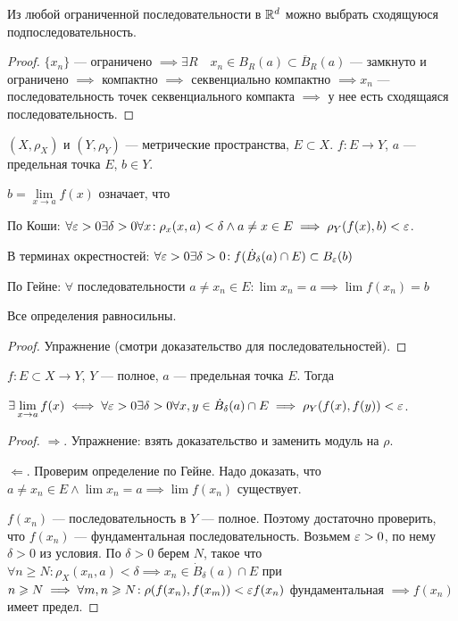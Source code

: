 \begin{theorem}
    Из любой ограниченной последовательности в $\mathbb{R}^d$ можно выбрать сходящуюся подпоследовательность.
\end{theorem}
\begin{proof}
    $\{x_n\}$ --- ограничено $\implies \exists R\quad x_n \in B_R(a) \subset \overline{B}_R(a)$ --- замкнуто и ограничено $\implies$ компактно  $\implies$ секвенциально компактно $\implies x_n$ --- последовательность точек секвенциального компакта  $\implies$ у нее есть сходящаяся последовательность.
\end{proof}
\begin{definition}
    $(X, \rho_X)$ и  $(Y, \rho_Y)$ --- метрические пространства, $E \subset X$.  $f\!: E \to Y$,  $a$ --- предельная точка  $E$,  $b \in Y$.

     $b = \lim\limits_{x \to a} f(x)$ означает, что

     По Коши:  $\forall \varepsilon > 0 \exists \delta > 0 \forall x\!: \rho_x(x,a) < \delta \land a \neq x \in E \implies \rho_Y(f(x), b) < \varepsilon$.

     В терминах окрестностей: $\forall \varepsilon > 0 \exists \delta > 0\!: f(\dot{B}_{\delta}(a) \cap E) \subset B_\varepsilon(b)$

     По Гейне: $\forall$ последовательности  $a \neq x_n \in E\!: \lim x_n = a \implies \lim f(x_n) = b$
\end{definition}
\begin{theorem}
    Все определения равносильны. 
\end{theorem}
\begin{proof}
    Упражнение (смотри доказательство для последовательностей).
\end{proof}
\begin{theorem}
    $f\!:E \subset X \to Y$,  $Y$ --- полное,  $a$ --- предельная точка  $E$. Тогда

     $\exists \lim\limits_{x \to a} f(x) \iff \forall \varepsilon > 0 \exists \delta > 0 \forall x, y \in \dot{B}_{\delta}(a) \cap E \implies \rho_Y(f(x), f(y)) < \varepsilon$.
\end{theorem}
\begin{proof}
    $\Rightarrow$. Упражнение: взять доказательство и заменить модуль на  $\rho$.

     $\Leftarrow$. Проверим определение по Гейне. Надо доказать, что  $a \neq x_n \in E \land \lim x_n = a \implies \lim f(x_n)$ существует.

      $f(x_n)$ --- последовательность в  $Y$ --- полное. Поэтому достаточно проверить, что  $f(x_n)$ --- фундаментальная последовательность. Возьмем  $\varepsilon > 0$, по нему  $\delta > 0$ из условия. По  $\delta > 0$ берем  $N$, такое что  $\forall n \ge N\!: \rho_X(x_n, a) < \delta \implies x_n \in \dot{B}_\delta(a)\cap E$ при $n \geqslant N \implies \forall m, n \geqslant N\!: \rho(f(x_n), f(x_m)) < \varepsilon f(x_n)$ фундаментальная $\implies f(x_n)$ имеет предел.
\end{proof}

